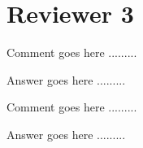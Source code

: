 %
%
\section*{Reviewer 3}
%
\begin{ReviewerComment}{3}
Comment goes here .........\end{ReviewerComment}
\begin{Answer}
Answer goes here .........
\end{Answer}

\begin{ReviewerComment}{3}
Comment goes here .........\end{ReviewerComment}
\begin{Answer}
Answer goes here .........
\end{Answer}